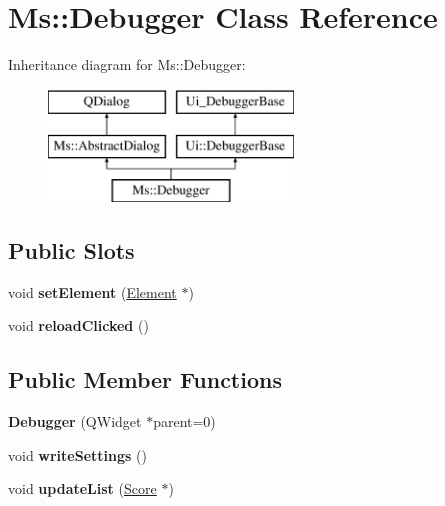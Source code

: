\hypertarget{class_ms_1_1_debugger}{}\section{Ms\+:\+:Debugger Class Reference}
\label{class_ms_1_1_debugger}
Inheritance diagram for Ms\+:\+:Debugger\+:\begin{figure}[H]
\begin{center}
\leavevmode
\includegraphics[height=3.000000cm]{class_ms_1_1_debugger}
\end{center}
\end{figure}
\subsection*{Public Slots}
\begin{DoxyCompactItemize}
\item 
\mbox{\label{class_ms_1_1_debugger_a9c0cb96b0d473bfa08757c3faef328d8}} 
void {\bfseries set\+Element} (\hyperlink{class_ms_1_1_element}{Element} $\ast$)
\item 
\mbox{\label{class_ms_1_1_debugger_afcfbd294da3204446e1bfe02e806c9a6}} 
void {\bfseries reload\+Clicked} ()
\end{DoxyCompactItemize}
\subsection*{Public Member Functions}
\begin{DoxyCompactItemize}
\item 
\mbox{\label{class_ms_1_1_debugger_a489398b2b97a0fc21a453df8df9db0fe}} 
{\bfseries Debugger} (Q\+Widget $\ast$parent=0)
\item 
\mbox{\label{class_ms_1_1_debugger_a0992a59675225bfab24639bb8a6317bc}} 
void {\bfseries write\+Settings} ()
\item 
\mbox{\label{class_ms_1_1_debugger_a619b0e2b4ee09c4436ce95c776ba20be}} 
void {\bfseries update\+List} (\hyperlink{class_ms_1_1_score}{Score} $\ast$)
\end{DoxyCompactItemize}
